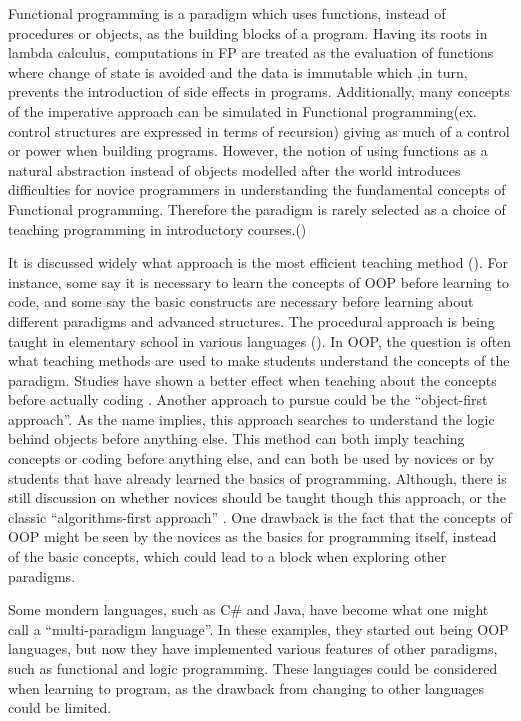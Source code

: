 Functional programming is a paradigm which uses functions, instead of procedures or objects, as the building blocks of a program. Having its roots in lambda calculus, computations in FP are treated as the evaluation of functions where change of state is avoided and the data is immutable which ,in turn, prevents the introduction of side effects in programs. Additionally, many concepts of the imperative approach can be simulated in Functional programming(ex. control structures are expressed in terms of recursion) giving as much of a control or power when building programs. However, the notion of using functions as a natural abstraction instead of objects modelled after the world introduces difficulties for novice programmers in understanding the fundamental concepts of Functional programming. Therefore the paradigm is rarely selected as a choice of teaching programming in introductory courses.()



It is discussed widely what approach is the most efficient teaching method (). For instance, some say it is necessary to learn the concepts of OOP before learning to code, and some say the basic constructs are necessary before learning about different paradigms and advanced structures. The procedural approach is being taught in elementary school in various languages (). In OOP, the question is often what teaching methods are used to make students understand the concepts of the paradigm. Studies have shown a better effect when teaching about the concepts before actually coding \cite{Xinogalos15}. Another approach to pursue could be the ``object-first approach''. As the name implies, this approach searches to understand the logic behind objects before anything else. This method can both imply teaching concepts or coding before anything else, and can both be used by novices or by students that have already learned the basics of programming. Although, there is still discussion on whether novices should be taught though this approach, or the classic ``algorithms-first approach'' \cite{Periyamasy12}. One drawback is the fact that the concepts of OOP might be seen by the novices as the basics for programming itself, instead of the basic concepts, which could lead to a block when exploring other paradigms.

Some mondern languages, such as C\# and Java, have become what one might call a ``multi-paradigm language''. In these examples, they started out being OOP languages, but now they have implemented various features of other paradigms, such as functional and logic programming. These languages could be considered when learning to program, as the drawback from changing to other languages could be limited.